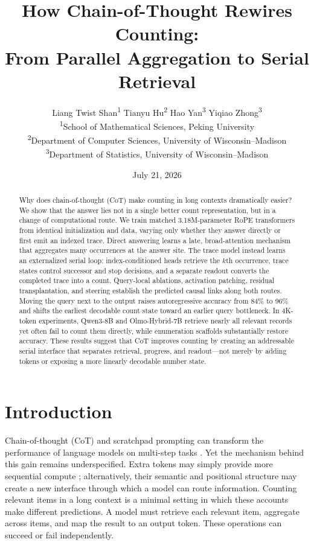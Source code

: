 \documentclass[11pt]{article}
\title{How Chain-of-Thought Rewires Counting:\\From Parallel Aggregation to Serial Retrieval}
\author{
Liang Twist Shan\textsuperscript{1}\quad
Tianyu Hu\textsuperscript{2}\quad
Hao Yan\textsuperscript{3}\quad
Yiqiao Zhong\textsuperscript{3}\\[0.6em]
{\small \textsuperscript{1}School of Mathematical Sciences, Peking University}\\
{\small \textsuperscript{2}Department of Computer Sciences, University of Wisconsin--Madison}\\
{\small \textsuperscript{3}Department of Statistics, University of Wisconsin--Madison}
}
\date{July 21, 2026}
\begin{document}
\maketitle

\begin{abstract}
Why does chain-of-thought (CoT) make counting in long contexts dramatically easier? We show that the answer lies not in a single better count representation, but in a change of computational route. We train matched 3.18M-parameter RoPE transformers from identical initialization and data, varying only whether they answer directly or first emit an indexed trace. Direct answering learns a late, broad-attention mechanism that aggregates many occurrences at the answer site. The trace model instead learns an externalized serial loop: index-conditioned heads retrieve the $k$th occurrence, trace states control successor and stop decisions, and a separate readout converts the completed trace into a count. Query-local ablations, activation patching, residual transplantation, and steering establish the predicted causal links along both routes. Moving the query next to the output raises autoregressive accuracy from 84\% to 96\% and shifts the earliest decodable count state toward an earlier query bottleneck. In 4K-token experiments, Qwen3-8B and Olmo-Hybrid-7B retrieve nearly all relevant records yet often fail to count them directly, while enumeration scaffolds substantially restore accuracy. These results suggest that CoT improves counting by creating an addressable serial interface that separates retrieval, progress, and readout---not merely by adding tokens or exposing a more linearly decodable number state.
\end{abstract}

\section{Introduction}

Chain-of-thought (CoT) and scratchpad prompting can transform the performance of language models on multi-step tasks \citep{nye2021scratchpads,wei2022cot}. Yet the mechanism behind this gain remains underspecified. Extra tokens may simply provide more sequential compute \citep{pfau2024dot}; alternatively, their semantic and positional structure may create a new interface through which a model can route information. Counting relevant items in a long context is a minimal setting in which these accounts make different predictions. A model must retrieve each relevant item, aggregate across items, and map the result to an output token. These operations can succeed or fail independently.
\end{document}

